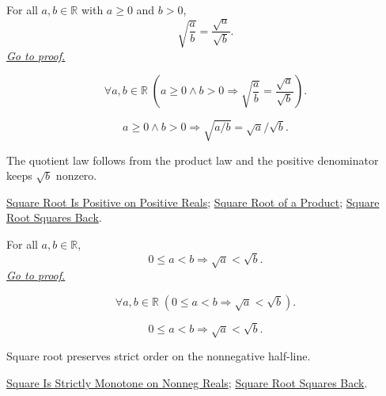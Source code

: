 \begin{theorem}
\label{thm:sqrt-quotient}
For all $a,b\in\mathbb{R}$ with $a\ge0$ and $b>0$,
\[
\sqrt{\frac{a}{b}}=\frac{\sqrt a}{\sqrt b}.
\]
\hyperref[prf:sqrt-quotient]{\textit{Go to proof.}}
\end{theorem}
\begin{remark*}
\[
\forall a,b\in\mathbb{R}\;
\left(a\ge0\land b>0\Rightarrow
\sqrt{\frac{a}{b}}=\frac{\sqrt a}{\sqrt b}\right).
\]
\end{remark*}
\begin{remark*}
\[
a\ge0\land b>0\Rightarrow \sqrt{a/b}=\sqrt a/\sqrt b.
\]
\end{remark*}
\begin{remark*}[Interpretation]
The quotient law follows from the product law and the positive denominator
keeps $\sqrt b$ nonzero.
\end{remark*}
\begin{dependencies}
\hyperref[thm:sqrt-positive]{Square Root Is Positive on Positive Reals};
\hyperref[thm:sqrt-product]{Square Root of a Product};
\hyperref[thm:sqrt-square]{Square Root Squares Back}.
\end{dependencies}

\begin{theorem}
\label{thm:ineq-square-root-strict-monotone}
For all $a,b\in\mathbb{R}$,
\[
0\le a<b\Rightarrow \sqrt a<\sqrt b.
\]
\hyperref[prf:ineq-square-root-strict-monotone]{\textit{Go to proof.}}
\end{theorem}
\begin{remark*}
\[
\forall a,b\in\mathbb{R}\;(0\le a<b\Rightarrow \sqrt a<\sqrt b).
\]
\end{remark*}
\begin{remark*}
\[
0\le a<b\Rightarrow \sqrt a<\sqrt b.
\]
\end{remark*}
\begin{remark*}[Interpretation]
Square root preserves strict order on the nonnegative half-line.
\end{remark*}
\begin{dependencies}
\hyperref[thm:ineq-square-monotone]{Square Is Strictly Monotone on Nonneg Reals};
\hyperref[thm:sqrt-square]{Square Root Squares Back}.
\end{dependencies}

